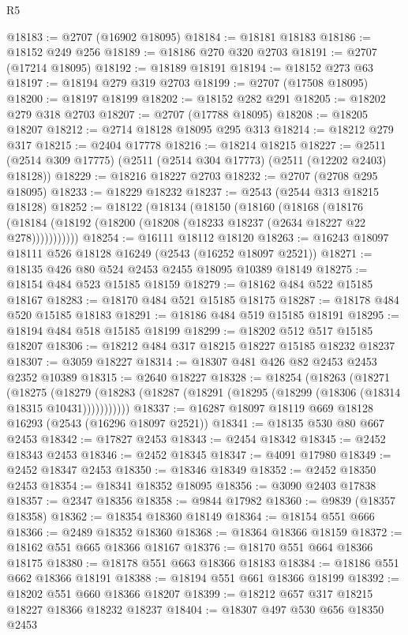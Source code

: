 \begin{lexlean}{R5}
\begin{coremodule}
@18183 := @2707 (@16902 @18095)
@18184 := @18181 @18183
@18186 := @18152 @249 @256
@18189 := @18186 @270 @320 @2703
@18191 := @2707 (@17214 @18095)
@18192 := @18189 @18191
@18194 := @18152 @273 @63
@18197 := @18194 @279 @319 @2703
@18199 := @2707 (@17508 @18095)
@18200 := @18197 @18199
@18202 := @18152 @282 @291
@18205 := @18202 @279 @318 @2703
@18207 := @2707 (@17788 @18095)
@18208 := @18205 @18207
@18212 := @2714 @18128 @18095 @295 @313
@18214 := @18212 @279 @317
@18215 := @2404 @17778
@18216 := @18214 @18215
@18227 := @2511 (@2514 @309 @17775) (@2511 (@2514 @304 @17773) (@2511 (@12202 @2403) @18128))
@18229 := @18216 @18227 @2703
@18232 := @2707 (@2708 @295 @18095)
@18233 := @18229 @18232
@18237 := @2543 (@2544 @313 @18215 @18128)
@18252 := @18122
    (@18134
      (@18150
        (@18160
          (@18168
            (@18176 (@18184 (@18192 (@18200 (@18208 (@18233 @18237 (@2634 @18227 @22 @278)))))))))))
@18254 := @16111 @18112 @18120
@18263 := @16243 @18097 @18111 @526 @18128 @16249 (@2543 (@16252 @18097 @2521))
@18271 := @18135 @426 @80 @524 @2453 @2455 @18095 @10389 @18149
@18275 := @18154 @484 @523 @15185 @18159
@18279 := @18162 @484 @522 @15185 @18167
@18283 := @18170 @484 @521 @15185 @18175
@18287 := @18178 @484 @520 @15185 @18183
@18291 := @18186 @484 @519 @15185 @18191
@18295 := @18194 @484 @518 @15185 @18199
@18299 := @18202 @512 @517 @15185 @18207
@18306 := @18212 @484 @317 @18215 @18227 @15185 @18232 @18237
@18307 := @3059 @18227
@18314 := @18307 @481 @426 @82 @2453 @2453 @2352 @10389
@18315 := @2640 @18227
@18328 := @18254
    (@18263
      (@18271
        (@18275
          (@18279 (@18283 (@18287 (@18291 (@18295 (@18299 (@18306 (@18314 @18315 @10431)))))))))))
@18337 := @16287 @18097 @18119 @669 @18128 @16293 (@2543 (@16296 @18097 @2521))
@18341 := @18135 @530 @80 @667 @2453
@18342 := @17827 @2453
@18343 := @2454 @18342
@18345 := @2452 @18343 @2453
@18346 := @2452 @18345
@18347 := @4091 @17980
@18349 := @2452 @18347 @2453
@18350 := @18346 @18349
@18352 := @2452 @18350 @2453
@18354 := @18341 @18352 @18095
@18356 := @3090 @2403 @17838
@18357 := @2347 @18356
@18358 := @9844 @17982
@18360 := @9839 (@18357 @18358)
@18362 := @18354 @18360 @18149
@18364 := @18154 @551 @666
@18366 := @2489 @18352 @18360
@18368 := @18364 @18366 @18159
@18372 := @18162 @551 @665 @18366 @18167
@18376 := @18170 @551 @664 @18366 @18175
@18380 := @18178 @551 @663 @18366 @18183
@18384 := @18186 @551 @662 @18366 @18191
@18388 := @18194 @551 @661 @18366 @18199
@18392 := @18202 @551 @660 @18366 @18207
@18399 := @18212 @657 @317 @18215 @18227 @18366 @18232 @18237
@18404 := @18307 @497 @530 @656 @18350 @2453

\end{coremodule}
\end{lexlean}

